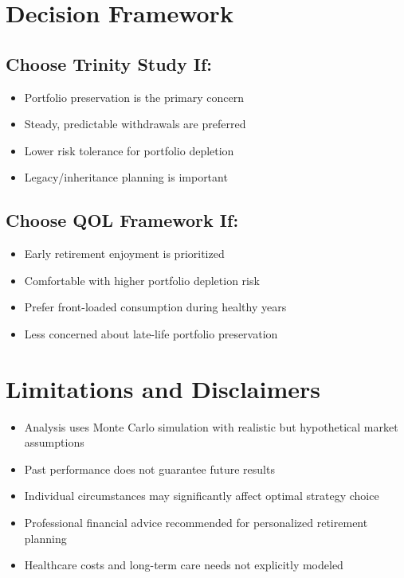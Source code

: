 \documentclass[11pt,letterpaper]{article}
\begin{document}
\section{Decision Framework}

\subsection{Choose Trinity Study If:}
\begin{itemize}
    \item Portfolio preservation is the primary concern
    \item Steady, predictable withdrawals are preferred
    \item Lower risk tolerance for portfolio depletion
    \item Legacy/inheritance planning is important
\end{itemize}

\subsection{Choose QOL Framework If:}
\begin{itemize}
    \item Early retirement enjoyment is prioritized
    \item Comfortable with higher portfolio depletion risk
    \item Prefer front-loaded consumption during healthy years
    \item Less concerned about late-life portfolio preservation
\end{itemize}

\section{Limitations and Disclaimers}

\begin{itemize}
    \item Analysis uses Monte Carlo simulation with realistic but hypothetical market assumptions
    \item Past performance does not guarantee future results
    \item Individual circumstances may significantly affect optimal strategy choice
    \item Professional financial advice recommended for personalized retirement planning
    \item Healthcare costs and long-term care needs not explicitly modeled
\end{itemize}
\end{document}
